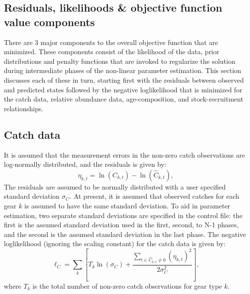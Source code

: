 		
		\subsection{Residuals, likelihoods \& objective function value components}\label{secLikelihoods}

There are 3 major components to the overall objective function that are minimized.  These components consist of the likelihood of the data, prior distributions and penalty functions that are invoked to regularize the solution during intermediate phases of the non-linear parameter estimation.  This section discusses each of these in turn, starting first with the residuals between observed and predicted states followed by the negative loglikelihood that is minimized for the catch data, relative abundance data, age-composition, and stock-recruitment relationships.

\subsection{Catch data}
It is assumed that the measurement errors in the non-zero catch observations are log-normally distributed, and the residuals is given by:
\begin{equation}\label{eq2}
\eta_{k,t}=\ln(C_{k,t}) -  \ln(\hat{C}_{k,t}),
\end{equation}
The residuals are assumed to be normally distributed with a user specified standard deviation $\sigma_{C}$.  At present, it is assumed that observed catches for each gear $k$ is assumed to have the same standard deviation.  To aid in parameter estimation, two separate standard deviations are specified in the control file: the first is the assumed standard deviation used in the first, second, to N-1 phases, and the second is the assumed standard deviation in the last phase.  The negative loglikelihood (ignoring the scaling constant) for the catch data is given by:
\begin{equation}\label{eq3}
\ell_C = \sum_k\left[  T_k\ln(\sigma_C)+\dfrac{\sum_{t \in \hat{C}_{k,t}\neq 0}(\eta_{k,t})^2}{2\sigma_C^2}\right],
\end{equation}
where $T_k$ is the total number of non-zero catch observations for gear type $k$.



